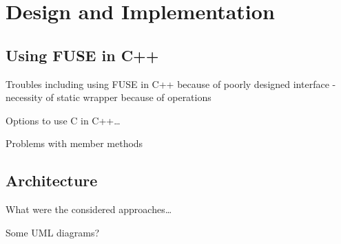 \chapter{Design and Implementation}
\label{chap:design-and-architecture}

\section{Using FUSE in C++}\label{sec:fuse-in-cpp}

Troubles including using FUSE in C++ because of poorly designed interface - necessity of static wrapper because of operations

Options to use C in C++\ldots

Problems with member methods

\section{Architecture}\label{sec:architecture}

What were the considered approaches\ldots

Some UML diagrams?